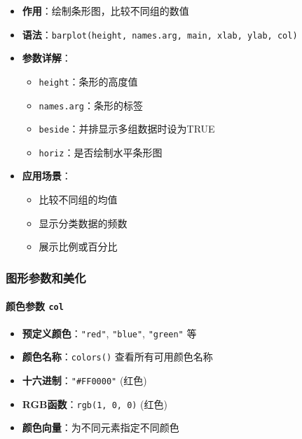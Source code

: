 \documentclass[
]{book}
\providecommand{\tightlist}{%
  \setlength{\itemsep}{0pt}\setlength{\parskip}{0pt}}
\begin{document}
\begin{itemize}
\tightlist
\item
  \textbf{作用}：绘制条形图，比较不同组的数值
\item
  \textbf{语法}：\texttt{barplot(height,\ names.arg,\ main,\ xlab,\ ylab,\ col)}
\item
  \textbf{参数详解}：

  \begin{itemize}
  \tightlist
  \item
    \texttt{height}：条形的高度值
  \item
    \texttt{names.arg}：条形的标签
  \item
    \texttt{beside}：并排显示多组数据时设为TRUE
  \item
    \texttt{horiz}：是否绘制水平条形图
  \end{itemize}
\item
  \textbf{应用场景}：

  \begin{itemize}
  \tightlist
  \item
    比较不同组的均值
  \item
    显示分类数据的频数
  \item
    展示比例或百分比
  \end{itemize}
\end{itemize}

\hypertarget{ux56feux5f62ux53c2ux6570ux548cux7f8eux5316}{%
\subsubsection{图形参数和美化}\label{ux56feux5f62ux53c2ux6570ux548cux7f8eux5316}}

\hypertarget{ux989cux8272ux53c2ux6570-col}{%
\paragraph{\texorpdfstring{颜色参数 \texttt{col}}{颜色参数 col}}\label{ux989cux8272ux53c2ux6570-col}}

\begin{itemize}
\tightlist
\item
  \textbf{预定义颜色}：\texttt{"red"}, \texttt{"blue"}, \texttt{"green"} 等
\item
  \textbf{颜色名称}：\texttt{colors()} 查看所有可用颜色名称
\item
  \textbf{十六进制}：\texttt{"\#FF0000"} (红色)
\item
  \textbf{RGB函数}：\texttt{rgb(1,\ 0,\ 0)} (红色)
\item
  \textbf{颜色向量}：为不同元素指定不同颜色
\end{itemize}
\end{document}
